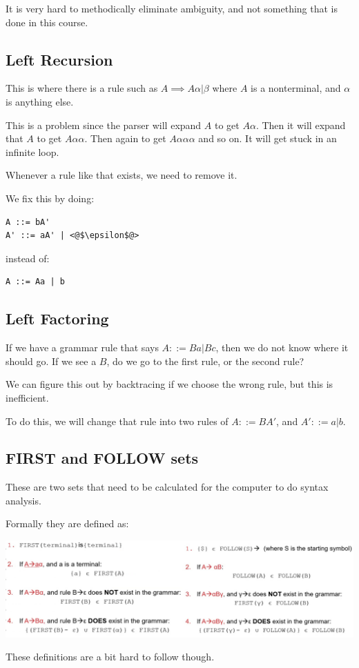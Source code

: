 \documentclass[12pt,letterpaper]{article} \usepackage{amsmath} \usepackage{graphicx} \usepackage[margin=1in]{geometry} \usepackage{longtable}  \usepackage{amssymb}
\begin{document}
	It is very hard to methodically eliminate ambiguity, and not something that is done in this course. 

	\subsection{Left Recursion}
	This is where there is a rule such as $A \implies A\alpha |\beta$ where $A$ is a nonterminal, and $\alpha$ is anything else. 
	
	This is a problem since the parser will expand $A$ to get $A\alpha$. Then it will expand that $A$ to get $A\alpha\alpha$. Then again to get $A\alpha\alpha\alpha$ and so on. It will get stuck in an infinite loop. 
	
	Whenever a rule like that exists, we need to remove it. 
	
	We fix this by doing:
	\begin{lstlisting}
A ::= bA'
A' ::= aA' | <@$\epsilon$@>
	\end{lstlisting}
	instead of:
	\begin{lstlisting}
A ::= Aa | b
	\end{lstlisting}
	
	\subsection{Left Factoring}
	If we have a grammar rule that says $A ::= Ba | Bc$, then we do not know where it should go. If we see a $B$, do we go to the first rule, or the second rule? 
	
	We can figure this out by backtracing if we choose the wrong rule, but this is inefficient. 
	
	To do this, we will change that rule into two rules of $A ::= BA'$, and $A' ::= a|b$.
	
	\subsection{FIRST and FOLLOW sets}
	These are two sets that need to be calculated for the computer to do syntax analysis. 
	
	Formally they are defined as:
	\begin{center}
		\includegraphics[width=0.9\linewidth]{first-follow-formal}
	\end{center}
	These definitions are a bit hard to follow though. 
	
\end{document}
